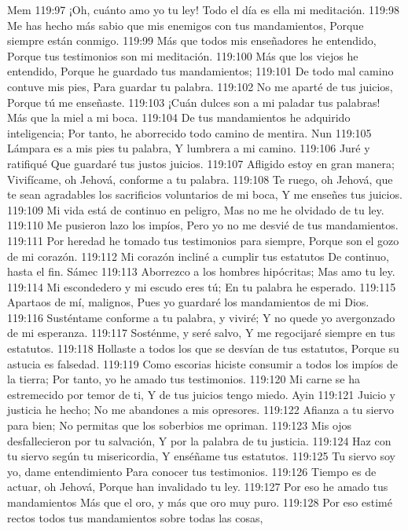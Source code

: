 Mem 
119:97 ¡Oh, cuánto amo yo tu ley! 
Todo el día es ella mi meditación. 
119:98 Me has hecho más sabio que mis enemigos con tus mandamientos, 
Porque siempre están conmigo. 
119:99 Más que todos mis enseñadores he entendido, 
Porque tus testimonios son mi meditación. 
119:100 Más que los viejos he entendido, 
Porque he guardado tus mandamientos; 
119:101 De todo mal camino contuve mis pies, 
Para guardar tu palabra. 
119:102 No me aparté de tus juicios, 
Porque tú me enseñaste. 
119:103 ¡Cuán dulces son a mi paladar tus palabras! 
Más que la miel a mi boca. 
119:104 De tus mandamientos he adquirido inteligencia; 
Por tanto, he aborrecido todo camino de mentira. 
Nun 
119:105 Lámpara es a mis pies tu palabra, 
Y lumbrera a mi camino. 
119:106 Juré y ratifiqué 
Que guardaré tus justos juicios. 
119:107 Afligido estoy en gran manera; 
Vivifícame, oh Jehová, conforme a tu palabra. 
119:108 Te ruego, oh Jehová, que te sean agradables los sacrificios voluntarios de mi boca, 
Y me enseñes tus juicios. 
119:109 Mi vida está de continuo en peligro, 
Mas no me he olvidado de tu ley. 
119:110 Me pusieron lazo los impíos, 
Pero yo no me desvié de tus mandamientos. 
119:111 Por heredad he tomado tus testimonios para siempre, 
Porque son el gozo de mi corazón. 
119:112 Mi corazón incliné a cumplir tus estatutos 
De continuo, hasta el fin. 
Sámec 
119:113 Aborrezco a los hombres hipócritas; 
Mas amo tu ley. 
119:114 Mi escondedero y mi escudo eres tú; 
En tu palabra he esperado. 
119:115 Apartaos de mí, malignos, 
Pues yo guardaré los mandamientos de mi Dios. 
119:116 Susténtame conforme a tu palabra, y viviré; 
Y no quede yo avergonzado de mi esperanza. 
119:117 Sosténme, y seré salvo, 
Y me regocijaré siempre en tus estatutos. 
119:118 Hollaste a todos los que se desvían de tus estatutos, 
Porque su astucia es falsedad. 
119:119 Como escorias hiciste consumir a todos los impíos de la tierra; 
Por tanto, yo he amado tus testimonios. 
119:120 Mi carne se ha estremecido por temor de ti, 
Y de tus juicios tengo miedo. 
Ayin 
119:121 Juicio y justicia he hecho; 
No me abandones a mis opresores. 
119:122 Afianza a tu siervo para bien; 
No permitas que los soberbios me opriman. 
119:123 Mis ojos desfallecieron por tu salvación, 
Y por la palabra de tu justicia. 
119:124 Haz con tu siervo según tu misericordia, 
Y enséñame tus estatutos. 
119:125 Tu siervo soy yo, dame entendimiento 
Para conocer tus testimonios. 
119:126 Tiempo es de actuar, oh Jehová, 
Porque han invalidado tu ley. 
119:127 Por eso he amado tus mandamientos 
Más que el oro, y más que oro muy puro. 
119:128 Por eso estimé rectos todos tus mandamientos sobre todas las cosas, 
